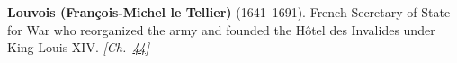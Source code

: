 \textbf{Louvois (François-Michel le Tellier)} (1641–1691). French Secretary of State for War who reorganized the army and founded the H\^{o}tel des Invalides under King Louis XIV. \emph{[Ch.~\hyperref[ch:ironmask]{44}]}

